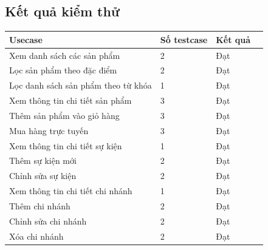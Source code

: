 \subsection{Kết quả kiểm thử}
{
    \setlength\extrarowheight{6pt}
    \begin{longtable}{| p{4cm}| p{4cm}| p{4cm}| p{4cm} |}
        \hline
        \textbf{Usecase} &  \textbf{Số testcase}  & \textbf{Kết quả} \\
        \hline
        Xem danh sách các sản phẩm  &  2              & Đạt             \\
        \hline
        Lọc sản phẩm theo đặc điểm  &  2              & Đạt             \\
        \hline
        Lọc danh sách sản phẩm theo từ khóa  &  1               & Đạt             \\
        \hline
        Xem thông tin chi tiết sản phẩm  &  3              & Đạt             \\
        \hline
        Thêm sản phẩm vào giỏ hàng  &   3               & Đạt             \\
        \hline
        Mua hàng trực tuyến  &   3               & Đạt             \\
        \hline
        Xem thông tin chi tiết sự kiện  &   1               & Đạt             \\
        \hline
        Thêm sự kiện mới  &  2               & Đạt             \\
        \hline
        Chỉnh sửa sự kiện  & 2             & Đạt             \\
        \hline
        Xem thông tin chi tiết chi nhánh  &  1              & Đạt             \\
        \hline
        Thêm chi nhánh  &  2              & Đạt             \\
        \hline
        Chỉnh sửa chi nhánh  &  2              & Đạt             \\
        \hline
        Xóa chi nhánh  &  2              & Đạt             \\

\end{longtable}}
